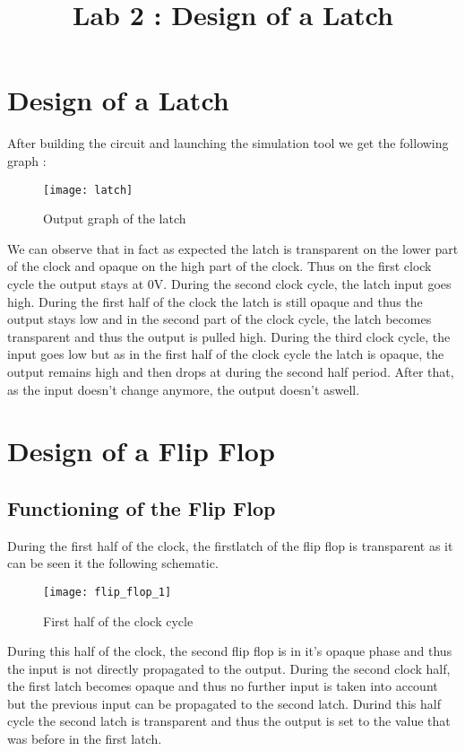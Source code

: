 \documentclass{article}
\title{\bfseries Lab 2 : Design of a Latch}
\date{}
\begin{document}
\thispagestyle{fancy}

\section{Design of a Latch}
After building the circuit and launching the simulation tool we get the following graph :

\begin{figure}[H]
\centerline{\texttt{[image: latch]}}
\caption{Output graph of the latch}
\end{figure}

We can observe that in fact as expected the latch is transparent on the lower part of the clock and opaque on the high part of the clock. Thus on the first clock cycle the output stays at 0V. During the second clock cycle, the latch input goes high. During the first half of the clock the latch is still opaque and thus the output stays low and in the second part of the clock cycle, the latch becomes transparent and thus the output is pulled high. During the third clock cycle, the input goes low but as in the first half of the clock cycle the latch is opaque, the output remains high and then drops at during the second half period. After that, as the input doesn't change anymore, the output doesn't aswell.

\section{Design of a Flip Flop}
\subsection{Functioning of the Flip Flop}
During the first half of the clock, the firstlatch of the flip flop is transparent as it can be seen it the following schematic.

\begin{figure}[H]
\centerline{\texttt{[image: flip\_flop\_1]}}
\caption{First half of the clock cycle}
\end{figure}

During this half of the clock, the second flip flop is in it's opaque phase and thus the input is not directly propagated to the output. During the second clock half, the first latch becomes opaque and thus no further input is taken into account but the previous input can be propagated to the second latch. Durind this half cycle the second latch is transparent and thus the output is set to the value that was before in the first latch. 
\end{document}

